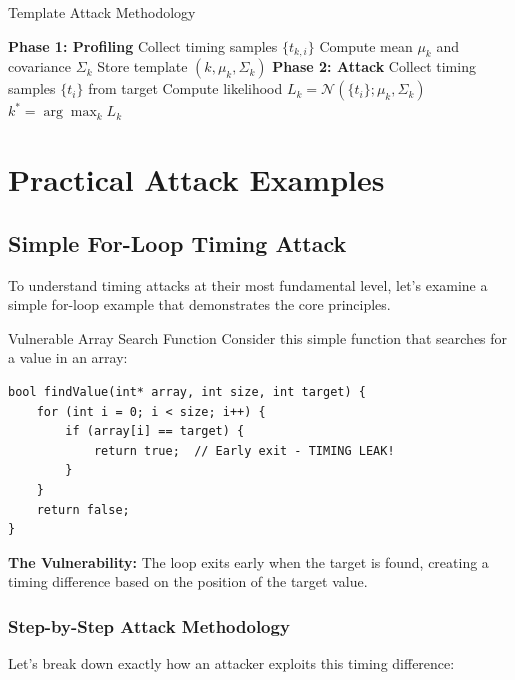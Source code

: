 \documentclass[12pt,a4paper]{article}
\theoremstyle{definition}
\begin{document}
\begin{algorithmbox}{Template Attack Methodology}
\begin{algorithmic}
\STATE \textbf{Phase 1: Profiling}
    \STATE Collect timing samples $\{t_{k,i}\}$
    \STATE Compute mean $\mu_k$ and covariance $\Sigma_k$
    \STATE Store template $(k, \mu_k, \Sigma_k)$
\ENDFOR
\STATE \textbf{Phase 2: Attack}
\STATE Collect timing samples $\{t_i\}$ from target
    \STATE Compute likelihood $L_k = \mathcal{N}(\{t_i\}; \mu_k, \Sigma_k)$
\ENDFOR
\RETURN $k^* = \arg\max_k L_k$
\end{algorithmic}
\end{algorithmbox}

\section{Practical Attack Examples}

\subsection{Simple For-Loop Timing Attack}

To understand timing attacks at their most fundamental level, let's examine a simple for-loop example that demonstrates the core principles.

\begin{examplebox}{Vulnerable Array Search Function}
Consider this simple function that searches for a value in an array:

\begin{lstlisting}[style=cryptoCode, caption={Vulnerable Linear Search Implementation}]
bool findValue(int* array, int size, int target) {
    for (int i = 0; i < size; i++) {
        if (array[i] == target) {
            return true;  // Early exit - TIMING LEAK!
        }
    }
    return false;
}
\end{lstlisting}

\textbf{The Vulnerability:} The loop exits early when the target is found, creating a timing difference based on the position of the target value.
\end{examplebox}

\subsubsection{Step-by-Step Attack Methodology}

Let's break down exactly how an attacker exploits this timing difference:
\end{document}

